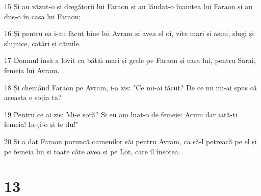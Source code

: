 \par 15 Și au văzut-o și dregătorii lui Faraon și au lăudat-o înaintea lui Faraon și au dus-o în casa lui Faraon;
\par 16 Și pentru ea i-au făcut bine lui Avram și avea el oi, vite mari și asini, slugi și slujnice, catâri și cămile.
\par 17 Domnul însă a lovit cu bătăi mari și grele pe Faraon și casa lui, pentru Sarai, femeia lui Avram.
\par 18 Și chemând Faraon pe Avram, i-a zis: "Ce mi-ai făcut? De ce nu mi-ai spus că aceasta e soția ta?
\par 19 Pentru ce ai zis: Mi-e soră? Și eu am luat-o de femeie: Acum dar iată-ți femeia! Ia-ți-o și te du!"
\par 20 Și a dat Faraon poruncă oamenilor săi pentru Avram, ca să-l petreacă pe el și pe femeia lui și toate câte avea și pe Lot, care îl însoțea.

\chapter{13}

